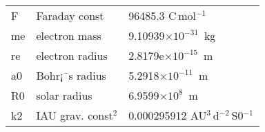 \begin{table}
\begin{center}
\begin{tabular}{lll}
         F      & Faraday const           &  96485.3 C\,mol$^{-1}$  \\
         me     & electron mass           &  9.10939$\times10^{-31}$\, kg  \\
         re     & electron radius         &  2.8179e$\times10^{-15}$\, m  \\
         a0     & Bohr¡¯s radius            &  5.2918$\times10^{-11}$\, m  \\
         R0     & solar radius            &  6.9599$\times10^{8}$\, m  \\
         k2     & IAU grav. const$^{2}$    &  0.000295912
         AU$^{3}$\,d$^{-2}$\,S0$^{-1}$ \\

\end{tabular}
\end{center}
\end{table}


